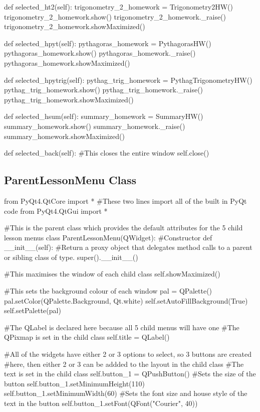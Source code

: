 \begin{landscape}
\begin{python}
    def selected_ht2(self):
        trigonometry_2_homework = Trigonometry2HW()
        trigonometry_2_homework.show()
        trigonometry_2_homework._raise()
        trigonometry_2_homework.showMaximized()

    def selected_hpyt(self):
        pythagoras_homework = PythagorasHW()
        pythagoras_homework.show()
        pythagoras_homework._raise()
        pythagoras_homework.showMaximized()

    def selected_hpytrig(self):
        pythag_trig_homework = PythagTrigonometryHW()
        pythag_trig_homework.show()
        pythag_trig_homework._raise()
        pythag_trig_homework.showMaximized()

    def selected_hsum(self):
        summary_homework = SummaryHW()
        summary_homework.show()
        summary_homework._raise()
        summary_homework.showMaximized()

    def selected_back(self):
        #This closes the entire window
        self.close()
\end{python}

\subsection{ParentLessonMenu Class}

\begin{python}
from PyQt4.QtCore import * #These two lines import all of the built in PyQt code
from PyQt4.QtGui import *

#This is the parent class which provides the default attributes for the 5 child lesson menus
class ParentLessonMenu(QWidget):
    #Constructor
    def __init__(self):
        #Return a proxy object that delegates method calls to a parent or sibling class of type.
        super().__init__()

        #This maximises the window of each child class
        self.showMaximized()

        #This sets the background colour of each window 
        pal = QPalette()
        pal.setColor(QPalette.Background, Qt.white)
        self.setAutoFillBackground(True)
        self.setPalette(pal)

        #The QLabel is declared here because all 5 child menus will have one
        #The QPixmap is set in the child class
        self.title = QLabel()

        #All of the widgets have either 2 or 3 options to select, so 3 buttons are created
        #here, then either 2 or 3 can be addded to the layout in the child class
        #The text is set in the child class
        self.button_1 = QPushButton()
        #Sets the size of the button
        self.button_1.setMinimumHeight(110)
        self.button_1.setMinimumWidth(60)
        #Sets the font size and house style of the text in the button
        self.button_1.setFont(QFont("Courier", 40))
        

\end{python}
\end{landscape}
